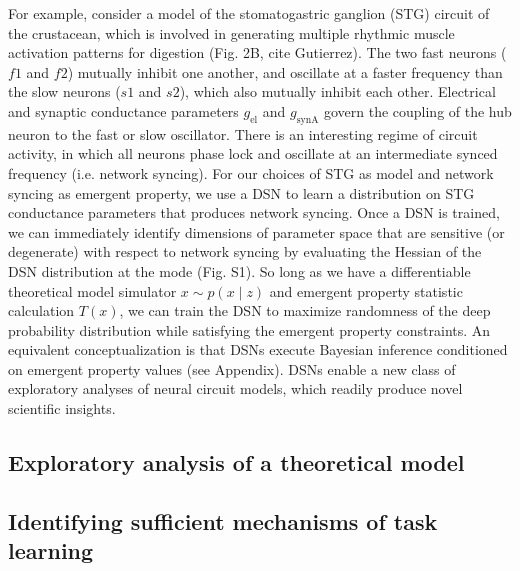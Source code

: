 \documentclass[11pt]{article}
\begin{document}
For example, consider a model of the stomatogastric ganglion (STG) circuit of the crustacean, which is involved in generating multiple rhythmic muscle activation patterns for digestion (Fig. 2B, cite Gutierrez).  The two fast neurons ($f1$ and $f2$) mutually inhibit one another, and oscillate at a faster frequency than the slow neurons ($s1$ and $s2$), which also mutually inhibit each other.  Electrical and synaptic conductance parameters $g_{\text{el}}$ and $g_{\text{synA}}$ govern the coupling of the hub neuron to the fast or slow oscillator.  There is an interesting regime of circuit activity, in which all neurons phase lock and oscillate at an intermediate synced frequency (i.e. network syncing).  For our choices of STG as model and network syncing as emergent property, we use a DSN to learn a distribution on STG conductance parameters that produces network syncing.  Once a DSN is trained, we can immediately identify dimensions of parameter space that are sensitive (or degenerate) with respect to network syncing by evaluating the Hessian of the DSN distribution at the mode (Fig. S1).  So long as we have a differentiable theoretical model simulator $x \sim p(x \mid z)$ and emergent property statistic calculation $T(x)$, we can train the DSN to maximize randomness of the deep probability distribution while satisfying the emergent property constraints.  An equivalent conceptualization is that DSNs execute Bayesian inference conditioned on emergent property values (see Appendix).  DSNs enable a new class of exploratory analyses of neural circuit models, which readily produce novel scientific insights.





\subsection{Exploratory analysis of a theoretical model}


\subsection{Identifying sufficient mechanisms of task learning}

\end{document}
